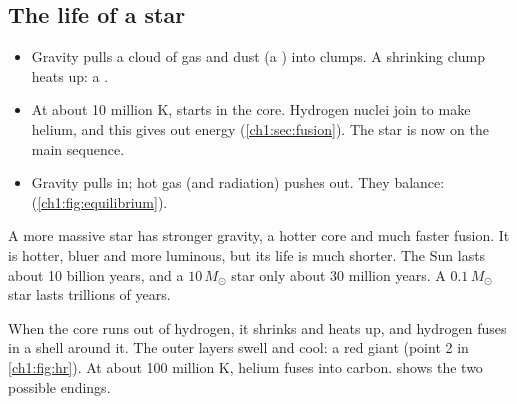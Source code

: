 \subsection{The life of a star}
\begin{sidebyside}[0.36]
  \centering
  \label{ch1:fig:equilibrium}
\nextside
  \begin{itemize}
    \item Gravity pulls a cloud of gas and dust (a ) into clumps. A
          shrinking clump heats up: a .
    \item At about 10 million K,  starts in the core. Hydrogen
          nuclei join to make helium, and this gives out energy
          (\cref{ch1:sec:fusion}). The star is now on the main sequence.
    \item Gravity pulls in; hot gas (and radiation) pushes out. They balance:
           (\cref{ch1:fig:equilibrium}).
  \end{itemize}
\end{sidebyside}

A more massive star has stronger gravity, a hotter core and much faster fusion. It is
hotter, bluer and more luminous, but its life is much shorter. The Sun lasts about 10
billion years, and a $10\,M_\odot$ star only about 30 million years. A $0.1\,M_\odot$
star lasts trillions of years.

When the core runs out of hydrogen, it shrinks and heats up, and hydrogen fuses in a
shell around it. The outer layers swell and cool: a red giant (point 2 in
\cref{ch1:fig:hr}). At about 100 million K, helium fuses into carbon.
 shows the two possible endings.

